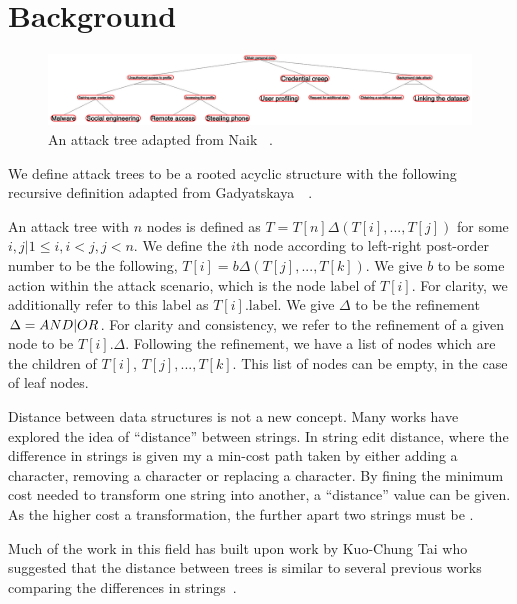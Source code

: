 \section{Background}

\begin{figure}
    \includegraphics[width=\linewidth]{img/TargetAT.png}
    \caption{An attack tree adapted from Naik \etal~\cite{naikEvaluationPotentialAttack2022}. }
    \label{fig:tartgetAT}
\end{figure}

We define attack trees to be a rooted acyclic structure with the following recursive definition adapted from Gadyatskaya~\etal~\cite{gadyatskayaRefinementAwareGenerationAttack2017}. 

\begin{definition} \label{def:attack-tree} An attack tree with $n$ nodes is defined as $T = T[n]\Delta(T[i],...,T[j])$ for some $i,j|1 \le i, i < j, j < n$. We define the $i\text{th}$ node according to left-right post-order number to be the following, $T[i] = b\Delta(T[j],...,T[k])$. We give $b$ to be some action within the attack scenario, which is the node label of $T[i]$. For clarity, we additionally refer to this label as $T[i].\text{label}$. We give $\Delta$ to be the refinement $\Delta = AND|OR$. For clarity and consistency, we refer to the refinement of a given node to be $T[i].\Delta$. Following the refinement, we have a list of nodes which are the children of $T[i]$, $T[j],...,T[k]$. This list of nodes can be empty, in the case of leaf nodes.
\end{definition}
      

Distance between data structures is not a new concept. Many works have explored the idea of ``distance'' between strings. In string edit distance, where the difference in strings is given my a min-cost path taken by either adding a character, removing a character or replacing a character. By fining the minimum cost needed to transform one string into another, a ``distance'' value can be given. As the higher cost a transformation, the further apart two strings must be .

Much of the work in this field has built upon work by Kuo-Chung Tai who suggested that the distance between trees is similar to several previous works comparing the differences in strings~\cite{tai_tree--tree_nodate}.


